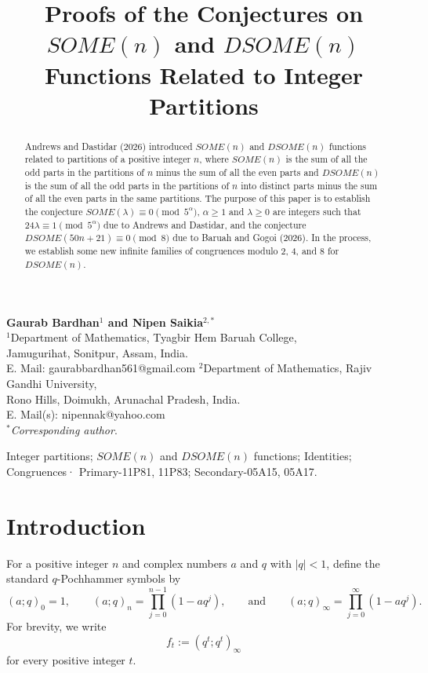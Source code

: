 \documentclass[12pt]{article}
\title{\textbf{Proofs of the Conjectures on $SOME(n)$ and $DSOME(n)$ Functions Related to Integer Partitions}}
\date{}
\numberwithin{equation}{section}
\theoremstyle{definition}
\theoremstyle{remark}
\numberwithin{equation}{section}
\begin{document}
\maketitle
\vspace{-2cm}
\begin{center}
	{\bf Gaurab Bardhan$^1$ and Nipen Saikia$^{2, \ast}$}\\
	$^1$Department of Mathematics, Tyagbir Hem Baruah College,\\ Jamugurihat, Sonitpur, Assam, India.\\
	E. Mail: gaurabbardhan561@gmail.com
	\vskip2mm
	$^2$Department of Mathematics, Rajiv Gandhi
	University,\\ Rono Hills, Doimukh, Arunachal Pradesh, India.\\
	E. Mail(s): nipennak@yahoo.com\\
	$^\ast$\textit{Corresponding author}.\end{center}
\begin{abstract}
Andrews and  Dastidar  (2026) introduced   $SOME(n)$ and 
$DSOME(n)$ functions related to  partitions  of a positive integer $n$, where $SOME(n)$ is the sum of all the odd parts in the partitions of $n$ minus the sum of all the even parts and $DSOME(n)$ is the
sum of all the odd parts in the partitions of $n$ into distinct parts minus
the sum of all the even parts in the same partitions. The purpose of this paper is to establish the conjecture
$SOME(\lambda)\equiv0\pmod{5^\alpha}$, $\alpha\ge 1$ and $\lambda\ge0$ are integers such that
$24\lambda\equiv1\pmod{5^\alpha}$ due to Andrews and  Dastidar, and the conjecture  $DSOME(50n+21)\equiv0\pmod{8}$ due to Baruah and Gogoi (2026). In the process, we establish  some new infinite families of congruences modulo 2, 4, and 8 for  $DSOME(n)$.
\end{abstract}

 Integer partitions; $SOME(n)$  and $DSOME(n)$ functions; Identities; Congruences·
\vskip 2mm
 Primary-11P81, 11P83; Secondary-05A15, 05A17.

\section{Introduction}
For a positive integer $n$ and complex numbers $a$ and $q$ with $|q|<1$, define the standard 
$q$-Pochhammer symbols by 
$$(a;q)_0=1,\qquad
(a;q)_n=\prod_{j=0}^{n-1}(1-aq^j),\qquad \mbox{and}\qquad
(a;q)_\infty=\prod_{j=0}^{\infty}(1-aq^j).$$
For brevity,   we write
$$f_t:=(q^t;q^t)_\infty$$ for every positive integer $t$.
\end{document}
